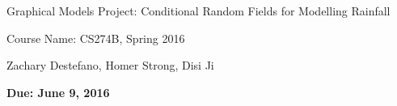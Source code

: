 \documentclass[twoside,11pt]{article}
\theoremstyle{definition}
\begin{document}
\centerline{Graphical Models Project: Conditional Random Fields for Modelling Rainfall}
\centerline{Course Name: CS274B, Spring 2016}
\centerline{Zachary Destefano, Homer Strong, Disi Ji}
\centerline{\bf Due: June 9, 2016}





\printbibliography
\end{document}
